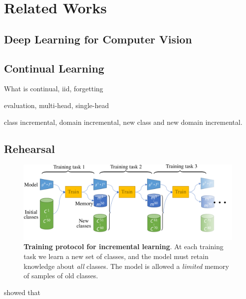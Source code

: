 \chapter{Related Works}
\label{chapter:related}

{}


\section{Deep Learning for Computer Vision}

\section{Continual Learning}

What is continual, iid, forgetting

evaluation, multi-head, single-head

class incremental, domain incremental, new class and new domain incremental. \cite{lomonaco2017core50}


\section{Rehearsal}

\begin{figure}[tb]
    \begin{center}
        \includegraphics[width=0.8\linewidth]{images/podnet/protocol}
    \end{center}
    \caption{\textbf{Training protocol for incremental learning}. At each training task we learn a
        new set of classes, and the model must retain knowledge about \textit{all} classes. The
        model is allowed a \textit{limited} memory of samples of old classes.}
    \label{fig:protocol}
\end{figure}

\citep{lesort2019regulshortcomings} showed that

